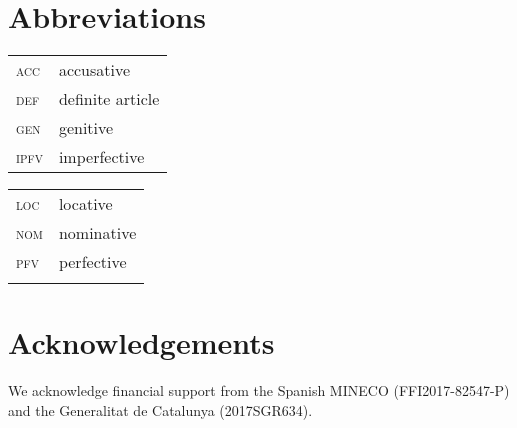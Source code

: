 \documentclass[output=paper,
colorlinks,
citecolor=brown,
newtxmath
]{langscibook}
\begin{document}

%

\section*{Abbreviations}

\begin{tabularx}{.5\textwidth}{@{}lX@{}}
\textsc{acc}&{accusative}\\
\textsc{def}&{definite article}\\
\textsc{gen}&{genitive}\\
\textsc{ipfv}&{imperfective}\\
\end{tabularx}%
\begin{tabularx}{.5\textwidth}{@{}lX@{}}
\textsc{loc}&{locative}\\
\textsc{nom}&{nominative}\\
\textsc{pfv}&{perfective}\\
&\\
\end{tabularx}

\section*{Acknowledgements}
We acknowledge financial support from the Spanish MINECO (FFI2017-82547-P) and the Generalitat de Catalunya (2017SGR634).

\sloppy
\printbibliography[heading=subbibliography,notkeyword=this]
\end{document}

